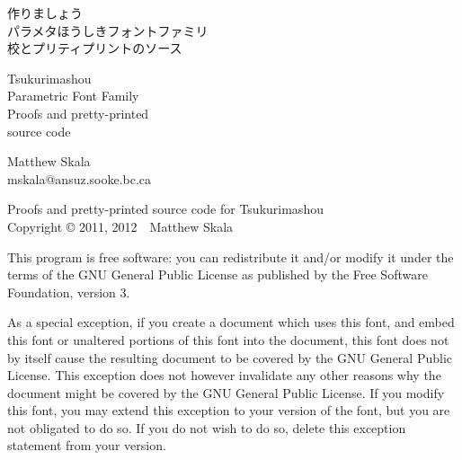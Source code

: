 
\makeatletter{}\makeatother



\pagestyle{plain}\thispagestyle{empty}


\kaku
\begin{center}\LARGE

\vspace*{\fill}

{\Huge 作りましょう~\TsukurimashouVWide}\\
{\huge パラメタほうしきフォントファミリ\\
校とプリティプリントのソース}

\vspace*{0.75in}

{\Huge Tsukurimashou~\TsukurimashouVersion}\\
{\huge Parametric Font Family\\
Proofs and pretty-printed\\source code}

\vspace*{1.5in}

Matthew Skala\\
mskala@ansuz.sooke.bc.ca\\
\TsukurimashouRDWide\qquad\TsukurimashouReleaseDate

\vspace*{\fill}

\end{center}
\clearpage


\vspace*{\fill}

Proofs and pretty-printed source code for Tsukurimashou\\
Copyright © 2011, 2012~~Matthew Skala

This program is free software: you can redistribute it and/or modify
it under the terms of the GNU General Public License as published by
the Free Software Foundation, version 3.

As a special exception, if you create a document which uses this font, and
embed this font or unaltered portions of this font into the document, this
font does not by itself cause the resulting document to be covered by the
GNU General Public License. This exception does not however invalidate any
other reasons why the document might be covered by the GNU General Public
License. If you modify this font, you may extend this exception to your
version of the font, but you are not obligated to do so. If you do not
wish to do so, delete this exception statement from your version.


